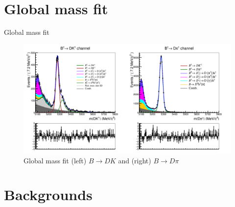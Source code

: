 \documentclass{beamer}
\begin{document}
\section{Global mass fit}
\begin{frame}{Global mass fit}
  \begin{figure}
    \centering
    \includegraphics[width = 1.0\textwidth]{GlobalFit.png}
    \caption{Global mass fit (left) $B\to DK$ and (right) $B\to D\pi$}
  \end{figure}
\end{frame}

\section{Backgrounds}
\end{document}
